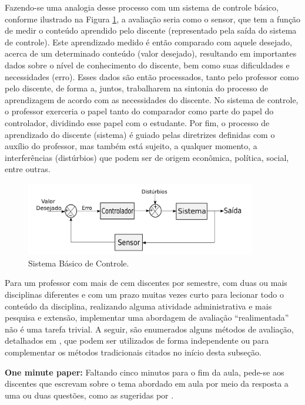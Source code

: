 \documentclass[
	12pt,				%
	openright,			%
	oneside,			%
	a4paper,			%
	english,			%
	brazil				%
	]{abntex2}
\begin{document}
Fazendo-se uma analogia desse processo com um sistema de controle básico, conforme ilustrado na Figura \ref{fig:X}, a avaliação seria como o sensor, que tem a função de medir o conteúdo aprendido pelo discente (representado pela saída do sistema de controle). Este aprendizado medido é então comparado com aquele desejado, acerca de um determinado conteúdo (valor desejado), resultando em importantes dados sobre o nível de conhecimento do discente, bem como suas dificuldades e necessidades (erro). Esses dados são então processados, tanto pelo professor como pelo discente, de forma a, juntos, trabalharem na sintonia do processo de aprendizagem de acordo com as necessidades do discente. No sistema de controle, o professor exerceria o papel tanto do comparador como parte do papel do controlador, dividindo esse papel com o estudante. Por fim, o processo de aprendizado do discente (sistema) é guiado pelas diretrizes definidas com o auxílio do professor, mas também está sujeito, a qualquer momento, a interferências (distúrbios) que podem ser de origem econômica, política, social, entre outras.
%
\begin{figure}[hbt]
	\centering
	\includegraphics[width=0.9\textwidth]{sist-controle}
	\caption{Sistema Básico de Controle.}
	\label{fig:X}
\end{figure}

Para um professor com mais de cem discentes por semestre, com duas ou mais disciplinas diferentes e com um prazo muitas vezes curto para lecionar todo o conteúdo da disciplina, realizando alguma atividade administrativa e mais pesquisa e extensão, implementar uma abordagem de avaliação ``realimentada'' não é uma tarefa trivial. A seguir, são enumerados alguns métodos de avaliação, detalhados em \citeauthor{elmoresauer}, que podem ser utilizados de forma independente ou para complementar os métodos tradicionais citados no início desta subseção.

\noindent \textbf{One minute paper:} Faltando cinco minutos para o fim da aula, pede-se aos discentes que escrevam sobre o tema abordado em aula por meio da resposta a uma ou duas questões, como as sugeridas por \citeauthor{elmoresauer}.
\end{document}
